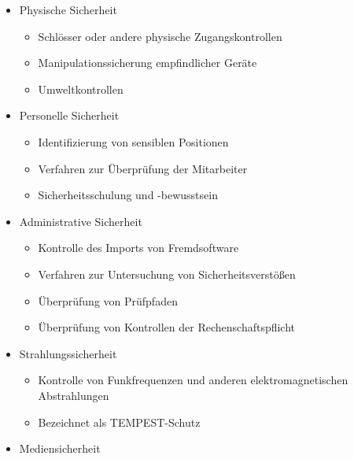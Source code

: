 \documentclass[a4paper]{article}
\begin{document}
\begin{multicols}{3}
    \begin{itemize}
        \item
              Physische Sicherheit

              \begin{itemize}
                  \item
                        Schlösser oder andere physische Zugangskontrollen
                  \item
                        Manipulationssicherung empfindlicher Geräte
                  \item
                        Umweltkontrollen
              \end{itemize}
        \item
              Personelle Sicherheit

              \begin{itemize}
                  \item
                        Identifizierung von sensiblen Positionen
                  \item
                        Verfahren zur Überprüfung der Mitarbeiter
                  \item
                        Sicherheitsschulung und -bewusstsein
              \end{itemize}
        \item
              Administrative Sicherheit

              \begin{itemize}
                  \item
                        Kontrolle des Imports von Fremdsoftware
                  \item
                        Verfahren zur Untersuchung von Sicherheitsverstößen
                  \item
                        Überprüfung von Prüfpfaden
                  \item
                        Überprüfung von Kontrollen der Rechenschaftspflicht
              \end{itemize}
        \item
              Strahlungssicherheit

              \begin{itemize}
                  \item
                        Kontrolle von Funkfrequenzen und anderen elektromagnetischen
                        Abstrahlungen
                  \item
                        Bezeichnet als TEMPEST-Schutz
              \end{itemize}
        \item
              Mediensicherheit


\end{itemize}
\end{multicols}
\end{document}
